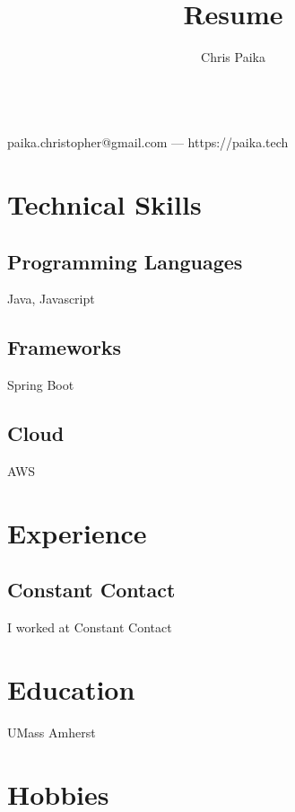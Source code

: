 \documentclass{article}
\makeatletter
\renewcommand{\maketitle}{
\begin{center}
{\huge\bfseries
\theauthor\\}
\vspace{.25em}
paika.christopher@gmail.com --- https://paika.tech
\end{center}
}
\makeatother
\begin{document}
\title{Resume}
\author{Chris Paika}

\maketitle
\section{Technical Skills}
\subsection{Programming Languages}
Java, Javascript
\subsection{Frameworks}
Spring Boot
\subsection{Cloud}
AWS
\section{Experience}
\subsection{Constant Contact}
I worked at Constant Contact
\section{Education}
UMass Amherst
\section{Hobbies}

\end{document}
